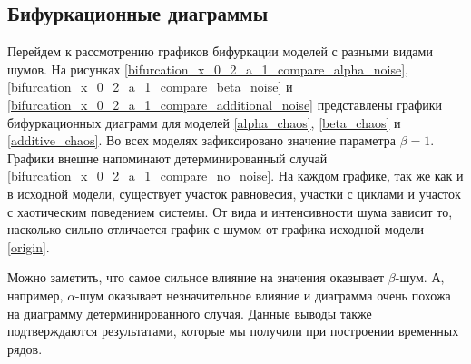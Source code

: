 \subsection{Бифуркационные диаграммы}

    Перейдем к рассмотрению графиков бифуркации моделей с разными видами шумов. На рисунках \ref{bifurcation_x_0_2_a_1_compare_alpha_noise}, \ref{bifurcation_x_0_2_a_1_compare_beta_noise} и \ref{bifurcation_x_0_2_a_1_compare_additional_noise} представлены графики бифуркационных диаграмм для моделей \ref{alpha_chaos}, \ref{beta_chaos} и \ref{additive_chaos}. Во всех моделях зафиксировано значение параметра \(\beta = 1\). Графики внешне напоминают детерминированный случай \ref{bifurcation_x_0_2_a_1_compare_no_noise}. На каждом графике, так же как и в исходной модели, существует участок равновесия, участки с циклами и участок с хаотическим поведением системы. От вида и интенсивности шума зависит то, насколько сильно отличается график с шумом от графика исходной модели \ref{origin}. 

    Можно заметить, что самое сильное влияние на значения оказывает \(\beta\)-шум. А, например, \(\alpha\)-шум оказывает незначительное влияние и диаграмма очень похожа на диаграмму детерминированного случая. Данные выводы также подтверждаются результатами, которые мы получили при построении временных рядов.


